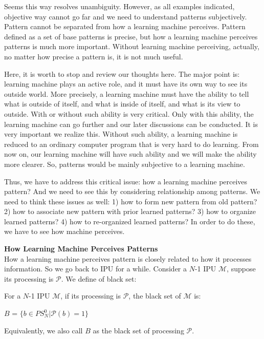 Seems this way resolves unambiguity. However, as all examples indicated, objective way cannot go far and we need to understand patterns subjectively. Pattern cannot be separated from how a learning machine perceives. Pattern defined as a set of base patterns is precise, but how a learning machine perceives patterns is much more important. Without learning machine perceiving, actually, no matter how precise a pattern is, it is not much useful.

Here, it is worth to stop and review our thoughts here. The major point is: learning machine plays an active role, and it must have its own way to see its outside world. More precisely, a learning machine must have the ability to tell what is outside of itself, and what is inside of itself, and what is its view to outside. With or without such ability is very critical. Only with this ability, the learning machine can go further and our later discussions can be conducted. It is very important we realize this. Without such ability, a learning machine is reduced to an ordinary computer program that is very hard to do learning. From now on, our learning machine will have such ability and we will make the ability more clearer. So, patterns would be mainly subjective to a learning machine. 

Thus, we have to address this critical issue: how a learning machine perceives pattern? And we need to see this by considering relationship among patterns. We need to think these issues as well: 1) how to form new pattern from old pattern? 2) how to associate new pattern with prior learned patterns? 3) how to organize learned patterns? 4) how to re-organized learned patterns? In order to do these, we have to see how machine perceives. 
\bigskip




{\bf How Learning Machine Perceives Patterns} \\
How a learning machine perceives pattern is closely related to how it processes information. So we go back to IPU for a while. Consider a $N$-1 IPU $\mathcal{M}$, suppose its processing is $\mathcal{P}$. We define of black set:


\begin{definition}
For a $N$-1 IPU $\mathcal{M}$, if its processing is $\mathcal{P}$, the black set of $\mathcal{M}$ is:
\begin{center}
$B$ = $\{ b \in PS^0_N | \mathcal{P}(b) = 1 \}$ 
\end{center}
\end{definition}
Equivalently, we also call $B$ as the black set of processing $\mathcal{P}$.

